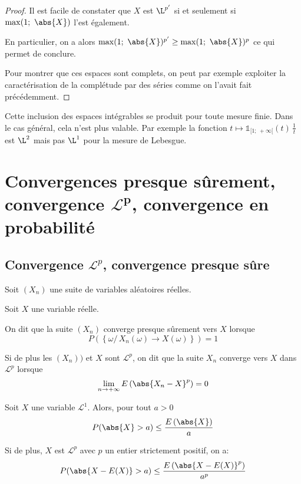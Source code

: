 \begin{proof}
Il est facile de constater que $X$ est $\L^{p'}$ si et seulement si $\max(1;~\abs{X})$ l'est également.

\medskip
En particulier, on a alors $\max(1;~\abs{X})^{p'} \geq \max(1;~\abs{X})^{p}$ ce qui permet de conclure.

\medskip
Pour montrer que ces espaces sont complets, on peut par exemple exploiter la caractérisation de la complétude par des séries comme on l'avait fait précédemment.
\end{proof}


\begin{cerveau}
Cette inclusion des espaces intégrables se produit pour toute mesure finie. Dans le cas général, cela n'est plus valable. Par exemple la fonction $t \mapsto \mathbb{1}_{[1;~+\infty[}(t) \, \frac{1}{t}$ est $\L^2$ mais pas $\L^1$ pour la mesure de Lebesgue.
\end{cerveau}


\section{Convergences presque sûrement, convergence $\mathbf{\mathcal{L}^p}$, convergence en probabilité}

\subsection{Convergence $\mathcal{L}^p$, convergence presque sûre}


\begin{de}
Soit $(X_n)$ une suite de variables aléatoires réelles.

Soit $X$ une variable réelle.

On dit que la suite $(X_n)$ converge presque sûrement vers $X$ lorsque 
\[
P\left(\left \{ \omega / \, X_n(\omega) \to X(\omega) \right \}\right) = 1
\]

Si de plus les $(X_n))$ et $X$ sont $\mathcal{L}^p$, on dit que la suite $X_n$ converge vers $X$ dans $\mathcal{L}^p$ lorsque
\[
\lim \limits_{n \to +\infty} E\left(\abs{X_n-X}^p\right) = 0
\]
\end{de}

\begin{prop}
Soit $X$ une variable $\mathcal{L}^1$. Alors, pour tout $a>0$
\[
P(\abs{X}>a) \leq \dfrac{E\left(\abs{X}\right)}{a}
\]

Si de plus, $X$ est $\mathcal{L}^p$ avec $p$ un entier strictement positif, on a:
\[
P(\abs{X-E(X)}>a) \leq \dfrac{E\left(\abs{X-E(X)}^p\right)}{a^p}
\]
\end{prop}

